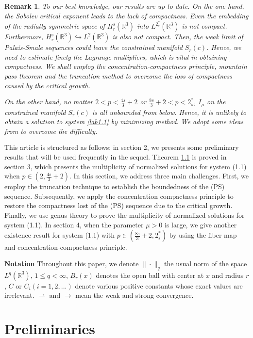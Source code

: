 \documentclass[11pt]{article}
\numberwithin{equation}{section}
\newtheorem{remark}[theorem]{Remark}
\begin{document}
\begin{remark}\rm
To our best knowledge, our results are up to date. On the one hand,
the Sobolev critical exponent leads to the lack of compactness.
Even the embedding of the radially symmetric space of $H^s_r(\mathbb{R}^3)$ into
$L^{2^*_s}(\mathbb{R}^3)$ is not compact. Furthermore,
$H^s_r(\mathbb{R}^3)\hookrightarrow L^2(\mathbb{R}^3)$ is also not compact.
Then, the weak limit of Palais-Smale sequences could leave the constrained manifold
$S_r(c)$. Hence, we need to estimate finely the Lagrange multipliers, which is vital
in obtaining compactness. We shall employ the concentration-compactness principle,
mountain pass theorem and the truncation method to overcome the loss of compactness
caused by the critical growth.

On the other hand, no matter $2<p<{\frac{4s}{3}+2}$ or $\frac{8s}{3}+2<p<2^*_s$,
$I_\mu$ on the constrained manifold $S_r(c)$ is all unbounded from below.
Hence, it is unlikely to obtain a solution to system \eqref{lab1.1} by minimizing
method. We adopt some ideas from \cite{A5878} to overcome the difficulty.
\end{remark}

This article is structured as follows:
in section 2, we presents some preliminary results that will be  used frequently
 in the sequel.
Theorem \href{https://doi.org/10.58997/ejde.2026.03}{1.1} is proved in section 3, which presents the multiplicity of
normalized solutions for system (1.1) when $p\in(2, \frac{4s}{3}+2)$.
In this section, we address three main challenges. First, we employ the truncation
technique to establish the boundedness of the (PS) sequence. Subsequently, we apply
the concentration compactness principle to restore the compactness lost of
the (PS) sequence due to the critical growth. Finally, we use genus theory to prove
the multiplicity of normalized solutions for system (1.1).
In section 4, when the parameter $\mu>0$ is large, we give another existence result
for system (1.1) with $p\in( \frac{8s}{3}+2, 2^*_s)$ by using the fiber map and
concentration-compactness principle.

\noindent\textbf{Notation}
Throughout this paper, we denote $\|\cdot\|_q$ the usual norm of the  space
$L^q(\mathbb{R}^3)$, $1\leq q <\infty$, $B_r(x)$ denotes the open ball with center at
$x$ and radius $r$, $C$ or $C_i (i=1,2,...)$ denote various positive constants whose
exact values are irrelevant. $\rightharpoonup$ and $\to$ mean the weak and strong
convergence.

\section{Preliminaries}
\end{document}
